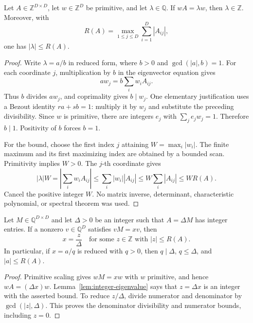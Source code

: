 \begin{lemma}
\label{lem:integer-eigenvalue}
Let $A\in\mathbb Z^{D\times D}$, let $w\in\mathbb Z^D$ be
primitive, and let $\lambda\in\mathbb Q$.  If
$wA=\lambda w$, then $\lambda\in\mathbb Z$.  Moreover, with
\[
 R(A)=\max_{1\le j\le D}\sum_{i=1}^D|A_{ij}|,
\]
one has $|\lambda|\le R(A)$.
\end{lemma}

\begin{proof}
Write $\lambda=a/b$ in reduced form, where $b>0$ and
$\gcd(|a|,b)=1$.  For each coordinate $j$, multiplication by $b$
in the eigenvector equation gives
\[
 a w_j=b\sum_iw_iA_{ij}.
\]
Thus $b$ divides $a w_j$, and coprimality gives $b\mid w_j$.
One elementary justification uses a Bezout identity $ra+sb=1$:
multiply it by $w_j$ and substitute the preceding divisibility.
Since $w$ is primitive, there are integers $e_j$ with
$\sum_j e_jw_j=1$.  Therefore $b\mid1$.  Positivity of $b$
forces $b=1$.

For the bound, choose the first index $j$ attaining
$W=\max_i|w_i|$.  The finite maximum and its first maximizing
index are obtained by a bounded scan.  Primitivity implies $W>0$.
The $j$-th coordinate gives
\[
 |\lambda|W
   =\left|\sum_iw_iA_{ij}\right|
   \le\sum_i|w_i||A_{ij}|
   \le W\sum_i|A_{ij}|
   \le WR(A).
\]
Cancel the positive integer $W$.  No matrix inverse, determinant,
characteristic polynomial, or spectral theorem was used.
\end{proof}

\begin{corollary}
\label{cor:eigenvalue-grid}
Let $M\in\mathbb Q^{D\times D}$ and let $\Delta>0$ be an
integer such that $A=\Delta M$ has integer entries.  If a nonzero
$v\in\mathbb Q^D$ satisfies $vM=xv$, then
\[
 x=\frac z\Delta
 \quad\text{for some }z\in\mathbb Z\text{ with }|z|\le R(A).
\]
In particular, if $x=a/q$ is reduced with $q>0$, then
$q\mid\Delta$, $q\le\Delta$, and $|a|\le R(A)$.
\end{corollary}

\begin{proof}
Primitive scaling gives $wM=xw$ with $w$ primitive, and hence
$wA=(\Delta x)w$.  Lemma~\ref{lem:integer-eigenvalue} says that
$z=\Delta x$ is an integer with the asserted bound.  To reduce
$z/\Delta$, divide numerator and denominator by
$\gcd(|z|,\Delta)$.  This proves the denominator divisibility
and numerator bounds, including $z=0$.
\end{proof}

